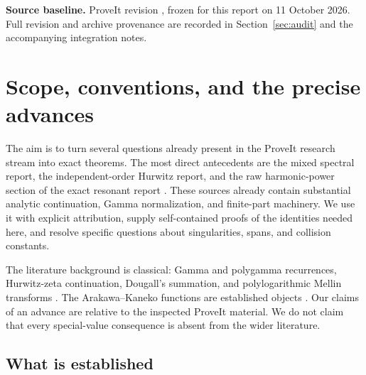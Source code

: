 \documentclass[11pt,a4paper]{article}
\numberwithin{equation}{section}
\theoremstyle{definition}
\theoremstyle{remark}
\newcommand{\src}[1]{\texttt{\detokenize{#1}}}
\begin{document}
\medskip
\noindent\textbf{Source baseline.}
ProveIt revision \src{921b58f10995}, frozen for this report on
11 October 2026. Full revision and archive provenance are recorded
in Section~\ref{sec:audit} and the accompanying integration notes.


\clearpage
\begingroup
\small
\setlength{\parskip}{0pt}
\tableofcontents
\endgroup
\clearpage
\section{Scope, conventions, and the precise advances}
\label{sec:scope}

The aim is to turn several questions already present in the ProveIt
research stream into exact theorems. The most direct antecedents are
the mixed spectral report, the independent-order Hurwitz report, and
the raw harmonic-power section of the exact resonant report
\cite{RepoMixed,RepoIndependent,RepoExactResonant}. These sources
already contain substantial analytic continuation, Gamma normalization,
and finite-part machinery. We use it with explicit attribution, supply
self-contained proofs of the identities needed here, and resolve
specific questions about singularities, spans, and collision constants.

The literature background is classical: Gamma and polygamma
recurrences, Hurwitz-zeta continuation, Dougall's summation, and
polylogarithmic Mellin transforms
\cite{DLMFPolygamma,DLMFHurwitz,DLMFDougall,DLMFPolylog}.
The Arakawa--Kaneko functions are established objects
\cite{ArakawaKaneko,KanekoTsumura}. Our claims of an advance are
relative to the inspected ProveIt material. We do not claim that every
special-value consequence is absent from the wider literature.

\subsection{What is established}
\end{document}
